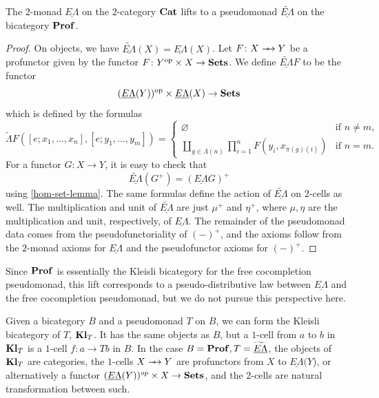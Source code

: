 \begin{thm}
The $2$-monad $\underline{E\Lambda}$ on the $2$-category $\mathbf{Cat}$ lifts to a pseudomonad $\widetilde{\underline{E\Lambda}}$ on the bicategory $\mathbf{Prof}$.
\end{thm}
\begin{proof}
On objects, we have $\widetilde{\underline{E\Lambda}}(X) = \underline{E\Lambda}(X)$. Let $F \colon  X \srarrow Y$ be a profunctor given by the functor $F \colon Y^{\textrm{op}} \times X \rightarrow \mathbf{Sets}$. We define $\widetilde{\underline{E\Lambda}}F$ to be the functor
  \[
    ( \underline{E\Lambda}(Y) )^{\textrm{op}} \times \underline{E\Lambda}(X) \rightarrow \mathbf{Sets}
  \]
which is defined by the formulas
  \[
    \widetilde{\Lambda}F \left( [e; x_1, \ldots, x_n], [e; y_1, \ldots, y_m] \right) = \left\{
    \begin{array}{lr}
    \varnothing & \textrm{if $n \neq m$}, \\
    \coprod_{g \in \Lambda(n)} \prod_{i=1}^{n} F\left(y_i, x_{\pi(g)(i)}\right) & \textrm{if $n = m$.}
    \end{array}
    \right.
  \]
For a functor $G \colon X \rightarrow Y$, it is easy to check that
  \[
    \widetilde{\underline{E\Lambda}}\left(G^{+}\right) = \left( \underline{E\Lambda} G \right)^{+}
  \]
using \cref{hom-set-lemma}. The same formulas define the action of  $\widetilde{\underline{E\Lambda}}$ on $2$-cells as well. The multiplication and unit of $\widetilde{\underline{E\Lambda}}$ are just $\mu^{+}$ and $\eta^{+}$, where $\mu, \eta$ are the multiplication and unit, respectively, of $\underline{E\Lambda}$. The remainder of the pseudomonad data comes from the pseudofunctoriality of $(-)^{+}$, and the axioms follow from the $2$-monad axioms for $\underline{E\Lambda}$ and the pseudofunctor axioms for $(-)^{+}$.
\end{proof}

\begin{rem}
Since $\mathbf{Prof}$ is essentially the Kleisli bicategory for the free cocompletion pseudomonad, this lift corresponds to a pseudo-distributive law between $\underline{E\Lambda}$ and the free cocompletion pseudomonad, but we do not pursue this perspective here.
\end{rem}

Given a bicategory $B$ and a pseudomonad $T$ on $B$, we can form the Kleisli bicategory of $T$, $\mathbf{Kl}_{T}$. It has the same objects as $B$, but a $1$-cell from $a$ to $b$ in  $\mathbf{Kl}_{T}$ is a $1$-cell $f \colon a \rightarrow Tb$ in $B$. In the case $B = \mathbf{Prof}, T = \widetilde{\underline{E\Lambda}}$, the objects of $\mathbf{Kl}_{T}$ are categories, the $1$-cells $X \srarrow Y$ are profunctors from $X$ to $\underline{E\Lambda}(Y$), or alternatively a functor $(\underline{E\Lambda}(Y))^{op} \times X \rightarrow \mathbf{Sets}$, and the $2$-cells are natural transformation between such.


